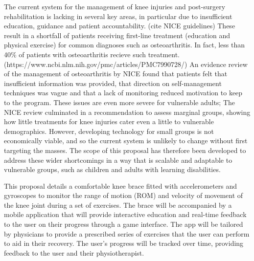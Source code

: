 \documentclass[main.tex]{subfiles}
\begin{document}
The current system for the management of knee injuries and post-surgery rehabilitation is lacking in several key areas, in particular due to insufficient education, guidance and patient accountability. (cite NICE guidelines)
These result in a shortfall of patients receiving first-line treatment (education and physical exercise) for common diagnoses such as osteoarthritis.
In fact, less than 40\% of patients with osteoarthritis recieve such treatment. (https://www.ncbi.nlm.nih.gov/pmc/articles/PMC7990728/)
An evidence review of the management of osteoarthritis by NICE found that patients felt that insufficient information was provided, that direction on self-management techniques was vague and that a lack of monitoring reduced motivation to keep to the program.
These issues are even more severe for vulnerable adults; The NICE review culminated in a recommendation to assess marginal groups, showing how little treatments for knee injuries cater even a little to vulnerable demographics.
However, developing technology for small groups is not economically viable, and so the current system is unlikely to change without first targeting the masses.
The scope of this proposal has therefore been developed to address these wider shortcomings in a way that is scalable and adaptable to vulnerable groups, such as children and adults with learning disabilities.

This proposal details a comfortable knee brace fitted with accelerometers and gyroscopes to monitor the range of motion (ROM) and velocity of movement of the knee joint during a set of exercises.
The brace will be accompanied by a mobile application that will provide interactive education and real-time feedback to the user on their progress through a game interface.
The app will be tailored by physicians to provide a prescribed series of exercises that the user can perform to aid in their recovery.
The user's progress will be tracked over time, providing feedback to the user and their physiotherapist.


\ifSubfilesClassLoaded{%
	\printbibliography{}
}{}
\end{document}
